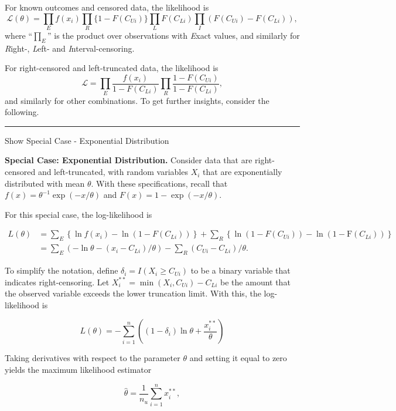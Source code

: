 \documentclass[]{book}
\theoremstyle{definition}
\theoremstyle{definition}
\theoremstyle{definition}
\theoremstyle{remark}
\begin{document}
For known outcomes and censored data, the likelihood is
\[\mathcal{L}(\theta) = \prod_{E} f(x_i) \prod_{R} \{1-F(C_{Ui})\} \prod_{L}
F(C_{Li}) \prod_{I} (F(C_{Ui})-F(C_{Li})),\] where ``\(\prod_{E}\)'' is
the product over observations with \emph{E}xact values, and similarly
for \emph{R}ight-, \emph{L}eft- and \emph{I}nterval-censoring.

For right-censored and left-truncated data, the likelihood is
\[\mathcal{L} = \prod_{E} \frac{f(x_i)}{1-F(C_{Li})} \prod_{R} \frac{1-F(C_{Ui})}{1-F(C_{Li})},\]
and similarly for other combinations. To get further insights, consider
the following.

\begin{center}\rule{0.5\linewidth}{\linethickness}\end{center}

Show Special Case - Exponential Distribution

\hypertarget{toggleExampleEXP}{}
\textbf{Special Case: Exponential Distribution.} Consider data that are
right-censored and left-truncated, with random variables \(X_i\) that
are exponentially distributed with mean \(\theta\). With these
specifications, recall that \(f(x) = \theta^{-1} \exp(-x/\theta)\) and
\(F(x) = 1-\exp(-x/\theta)\).

For this special case, the log-likelihood is

\[
\begin{aligned}
L(\theta) &= \sum_{E} \left\{ \ln f(x_i) - \ln (1-F(C_{Li})) \right\} + \sum_{R}\left\{ \ln (1-F(C_{Ui}))- \ln (1-\mathrm{F}(C_{Li})) \right\}\\
&= \sum_{E} (-\ln \theta -(x_i-C_{Li})/\theta ) -\sum_{R} (C_{Ui}-C_{Li})/\theta .
\end{aligned}
\]

To simplify the notation, define \(\delta_i = I(X_i \geq C_{Ui})\) to be
a binary variable that indicates right-censoring. Let
\(X_i^{\ast \ast} = \min(X_i, C_{Ui}) - C_{Li}\) be the amount that the
observed variable exceeds the lower truncation limit. With this, the
log-likelihood is

\begin{equation} 
  L(\theta) =  - \sum_{i=1}^n ((1-\delta_i) \ln \theta + \frac{x_i^{\ast \ast}}{\theta})
  \label{eq:EXPloglik}
\end{equation}

Taking derivatives with respect to the parameter \(\theta\) and setting
it equal to zero yields the maximum likelihood estimator

\[\widehat{\theta}  = \frac{1}{n_u} \sum_{i=1}^n  x_i^{\ast \ast},\]
\end{document}
